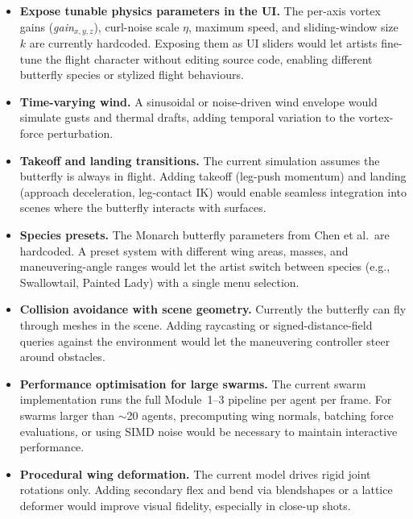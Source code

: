 \documentclass[12pt]{article}
\begin{document}
\begin{itemize}
  \item \textbf{Expose tunable physics parameters in the UI.} The per-axis
    vortex gains (\textit{gain}$_{x,y,z}$), curl-noise scale $\eta$, maximum
    speed, and sliding-window size $k$ are currently hardcoded. Exposing them
    as UI sliders would let artists fine-tune the flight character without
    editing source code, enabling different butterfly species or stylized
    flight behaviours.

  \item \textbf{Time-varying wind.} A sinusoidal or noise-driven wind
    envelope would simulate gusts and thermal drafts, adding temporal
    variation to the vortex-force perturbation.

  \item \textbf{Takeoff and landing transitions.} The current simulation
    assumes the butterfly is always in flight. Adding takeoff (leg-push
    momentum) and landing (approach deceleration, leg-contact IK) would
    enable seamless integration into scenes where the butterfly interacts with
    surfaces.

  \item \textbf{Species presets.} The Monarch butterfly parameters from
    Chen et al.\ are hardcoded. A preset system with different wing areas,
    masses, and maneuvering-angle ranges would let the artist switch between
    species (e.g., Swallowtail, Painted Lady) with a single menu selection.

  \item \textbf{Collision avoidance with scene geometry.} Currently the
    butterfly can fly through meshes in the scene. Adding raycasting or
    signed-distance-field queries against the environment would let the
    maneuvering controller steer around obstacles.

  \item \textbf{Performance optimisation for large swarms.} The current
    swarm implementation runs the full Module~1--3 pipeline per agent per
    frame. For swarms larger than $\sim$20 agents, precomputing wing normals,
    batching force evaluations, or using SIMD noise would be necessary to
    maintain interactive performance.

  \item \textbf{Procedural wing deformation.} The current model drives rigid
    joint rotations only. Adding secondary flex and bend via blendshapes or
    a lattice deformer would improve visual fidelity, especially in close-up
    shots.
\end{itemize}
\end{document}

